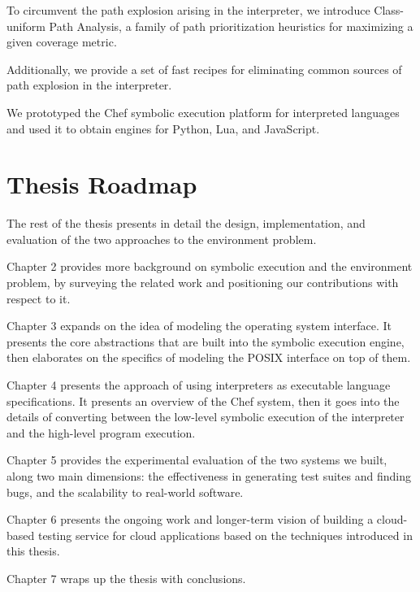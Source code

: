 To circumvent the path explosion arising in the interpreter, we introduce Class-uniform Path Analysis, a family of path prioritization heuristics for maximizing a given coverage metric.

Additionally, we provide a set of fast recipes for eliminating common sources of path explosion in the interpreter.

We prototyped the Chef symbolic execution platform for interpreted languages and used it to obtain engines for Python, Lua, and JavaScript.


\section{Thesis Roadmap}

The rest of the thesis presents in detail the design, implementation, and evaluation of the two approaches to the environment problem.

Chapter 2 provides more background on symbolic execution and the environment problem, by surveying the related work and positioning our contributions with respect to it.

Chapter 3 expands on the idea of modeling the operating system interface.  It presents the core abstractions that are built into the symbolic execution engine, then elaborates on the specifics of modeling the POSIX interface on top of them.

Chapter 4 presents the approach of using interpreters as executable language specifications.  It presents an overview of the Chef system, then it goes into the details of converting between the low-level symbolic execution of the interpreter and the high-level program execution.

Chapter 5 provides the experimental evaluation of the two systems we built, along two main dimensions: the effectiveness in generating test suites and finding bugs, and the scalability to real-world software.

Chapter 6 presents the ongoing work and longer-term vision of building a cloud-based testing service for cloud applications based on the techniques introduced in this thesis.

Chapter 7 wraps up the thesis with conclusions.


